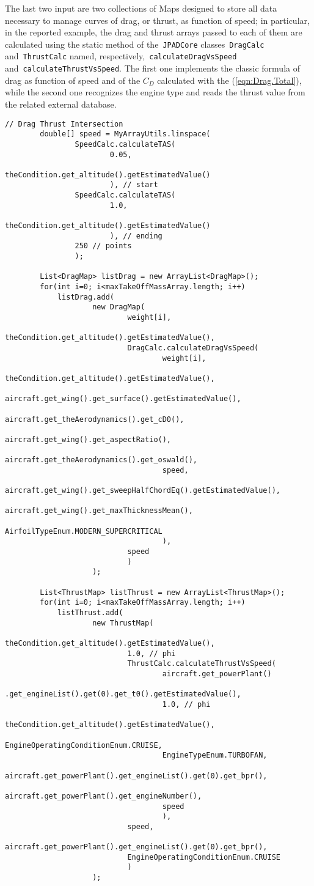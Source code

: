 \bigskip
\noindent
The last two input are two collections of \gls{Map}s designed to store all data necessary to manage curves of drag, or thrust, as function of speed; in particular, in the reported example, the drag and thrust arrays passed to each of them are calculated using the static method of the~\lstinline[language=Java]!JPADCore! classes~\lstinline[language=Java]!DragCalc! and~\lstinline[language=Java]!ThrustCalc! named, respectively,~\lstinline[language=Java]!calculateDragVsSpeed! and~\lstinline[language=Java]!calculateThrustVsSpeed!. 
%
The first one implements the classic formula of drag as function of speed and of the $C_{D}$ calculated with the (\ref{eqn:Drag.Total}), while the second one recognizes the engine type and reads the thrust value from the related external database.

\bigskip
\begin{lstlisting}[caption={Intersection of drag and thrust curves in Specific Range test - B747-100B}, captionpos=b, tabsize=2]
		// Drag Thrust Intersection		
		double[] speed = MyArrayUtils.linspace(
				SpeedCalc.calculateTAS(
						0.05,
						theCondition.get_altitude().getEstimatedValue()
						), // start
				SpeedCalc.calculateTAS(
						1.0,
						theCondition.get_altitude().getEstimatedValue()
						), // ending
				250 // points
				);

		List<DragMap> listDrag = new ArrayList<DragMap>();
		for(int i=0; i<maxTakeOffMassArray.length; i++)
			listDrag.add(
					new DragMap(
							weight[i],
							theCondition.get_altitude().getEstimatedValue(),
							DragCalc.calculateDragVsSpeed(
									weight[i],
									theCondition.get_altitude().getEstimatedValue(),
									aircraft.get_wing().get_surface().getEstimatedValue(),
									aircraft.get_theAerodynamics().get_cD0(),
									aircraft.get_wing().get_aspectRatio(),
									aircraft.get_theAerodynamics().get_oswald(),
									speed,
									aircraft.get_wing().get_sweepHalfChordEq().getEstimatedValue(),
									aircraft.get_wing().get_maxThicknessMean(),
									AirfoilTypeEnum.MODERN_SUPERCRITICAL
									),
							speed
							)
					);

		List<ThrustMap> listThrust = new ArrayList<ThrustMap>();
		for(int i=0; i<maxTakeOffMassArray.length; i++)
			listThrust.add(
					new ThrustMap(
							theCondition.get_altitude().getEstimatedValue(),
							1.0, // phi
							ThrustCalc.calculateThrustVsSpeed(
									aircraft.get_powerPlant()
													.get_engineList().get(0).get_t0().getEstimatedValue(),
									1.0, // phi
									theCondition.get_altitude().getEstimatedValue(),
									EngineOperatingConditionEnum.CRUISE,
									EngineTypeEnum.TURBOFAN,
									aircraft.get_powerPlant().get_engineList().get(0).get_bpr(),
									aircraft.get_powerPlant().get_engineNumber(),
									speed
									),
							speed,
							aircraft.get_powerPlant().get_engineList().get(0).get_bpr(),
							EngineOperatingConditionEnum.CRUISE
							)
					);


\end{lstlisting}
